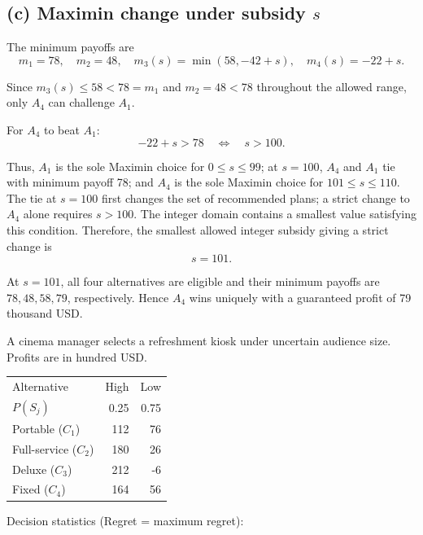 \secInicio[sec:q1]

\label{sol:q1c}
\subsection*{(c) Maximin change under subsidy $s$ }

The minimum payoffs are
\[
m_1=78,\quad m_2=48,\quad
m_3(s)=\min(58,-42+s),\quad m_4(s)=-22+s.
\]

Since $m_3(s)\le58<78=m_1$ and $m_2=48<78$ throughout
the allowed range, only $A_4$ can challenge $A_1$.

For $A_4$ to beat $A_1$:
\[
-22+s>78
\quad\Longleftrightarrow\quad s>100.
\]

Thus, $A_1$ is the sole Maximin choice for $0\le s\le99$;
at $s=100$, $A_4$ and $A_1$ tie with minimum payoff 78;
and $A_4$ is the sole Maximin choice for $101\le s\le110$.
The tie at $s=100$ first changes the set of recommended plans;
a strict change to $A_4$ alone requires $s>100$.
The integer domain contains a smallest value satisfying this condition.
Therefore, the smallest allowed integer subsidy giving a strict change is
\[
\boxed{s=101}.
\]

At $s=101$, all four alternatives are eligible and their minimum
payoffs are $78,48,58,79$, respectively. Hence $A_4$ wins uniquely
with a guaranteed profit of 79 thousand USD.
\secInicio[sec:q1]



A cinema manager selects a refreshment kiosk under uncertain audience size. Profits are in hundred USD.

\begin{center}\small\setlength{\tabcolsep}{4pt}
	\begin{tabular}{lrr}\toprule
		Alternative & High & Low\\
		$P(S_j)$ & 0.25 & 0.75\\ \midrule
				Portable ($C_1$) & 112 & 76\\
		Full-service ($C_2$) & 180 & 26\\
		Deluxe ($C_3$) & 212 & -6\\
		Fixed ($C_4$) & 164 & 56\\
		\bottomrule
	\end{tabular}
\end{center} \vspace{-3mm}

Decision statistics (Regret = maximum regret):

